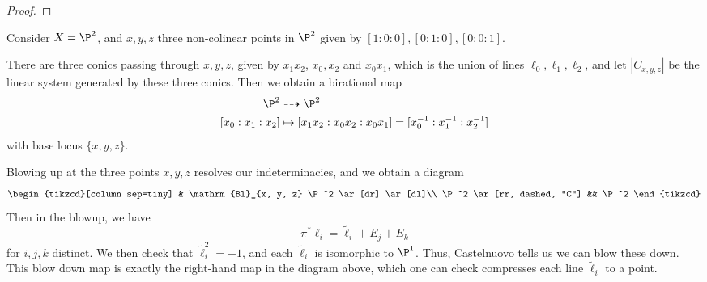\documentclass[a4paper]{article}
\newcommand\Bl{\mathrm{Bl}}
\begin{document}
\begin{proof}
\end{proof}

\begin{eg}
  Consider $X = \P^2$, and $x, y, z$ three non-colinear points in $\P^2$ given by $[1:0:0], [0:1:0], [0:0:1]$.

  There are three conics passing through $x, y, z$, given by $x_1 x_2$, $x_0, x_2$ and $x_0 x_1$, which is the union of lines $\ell_0, \ell_1, \ell_2$, and let $|C_{x, y, z}|$ be the linear system generated by these three conics. Then we obtain a birational map
  \begin{align*}
    \P^2 &\dashrightarrow \P^2\\
    [x_0:x_1:x_2] & \mapsto [x_1 x_2: x_0 x_2: x_0 x_1] = [x_0^{-1}:x_1^{-1}:x_2^{-1}]
  \end{align*}
  with base locus $\{x, y, z\}$.

  Blowing up at the three points $x, y, z$ resolves our indeterminacies, and we obtain a diagram
  \[
    \begin{tikzcd}[column sep=tiny]
      & \Bl_{x, y, z} \P^2 \ar[dr] \ar[dl]\\
      \P^2 \ar[rr, dashed, "C"] && \P^2
    \end{tikzcd}
  \]
  Then in the blowup, we have
  \[
    \pi^* \ell_i = \tilde{\ell}_i + E_j + E_k
  \]
  for $i, j, k$ distinct. We then check that $\tilde{\ell}_i^2 = -1$, and each $\tilde{\ell}_i$ is isomorphic to $\P^1$. Thus, Castelnuovo tells us we can blow these down. This blow down map is exactly the right-hand map in the diagram above, which one can check compresses each line $\tilde{\ell}_i$ to a point.
\end{eg}
\end{document}
